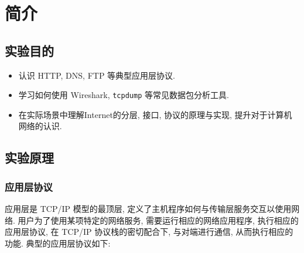\documentclass{ned-article}
\begin{document}
\maketitle

\tableofcontents

\section{简介}

\subsection{实验目的}

\begin{itemize}[noitemsep]
    \item 认识 HTTP, DNS, FTP 等典型应用层协议.
    \item 学习如何使用 Wireshark, \texttt{tcpdump} 等常见数据包分析工具.
    \item 在实际场景中理解Internet的分层, 接口, 协议的原理与实现, 提升对于计算机网络的认识.
\end{itemize}

\subsection{实验原理}

\subsubsection{应用层协议}

应用层是 TCP/IP 模型的最顶层, 定义了主机程序如何与传输层服务交互以使用网络. 用户为了使用某项特定的网络服务, 需要运行相应的网络应用程序, 执行相应的应用层协议, 在 TCP/IP 协议栈的密切配合下, 与对端进行通信, 从而执行相应的功能. 典型的应用层协议如下:
\end{document}
